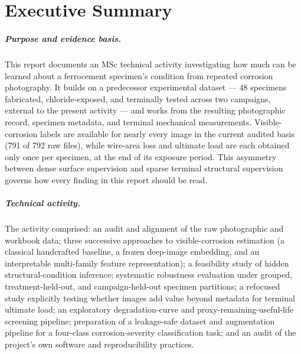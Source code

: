 \chapter*{Executive Summary}

\paragraph{Purpose and evidence basis.} This report documents an MSc
technical activity investigating how much can be learned about a
ferrocement specimen's condition from repeated corrosion photography. It
builds on a predecessor experimental dataset — 48 specimens fabricated,
chloride-exposed, and terminally tested across two campaigns, external to
the present activity — and works from the resulting photographic record,
specimen metadata, and terminal mechanical measurements. Visible-corrosion
labels are available for nearly every image in the current audited basis
(791 of 792 raw files), while wire-area loss and ultimate load are each
obtained only once per specimen, at the end of its exposure period. This
asymmetry between dense surface supervision and sparse terminal structural
supervision governs how every finding in this report should be read.

\paragraph{Technical activity.} The activity comprised: an audit and
alignment of the raw photographic and workbook data; three successive
approaches to visible-corrosion estimation (a classical handcrafted
baseline, a frozen deep-image embedding, and an interpretable
multi-family feature representation); a feasibility study of hidden
structural-condition inference; systematic robustness evaluation under
grouped, treatment-held-out, and campaign-held-out specimen partitions; a
refocused study explicitly testing whether images add value beyond
metadata for terminal ultimate load; an exploratory degradation-curve and
proxy-remaining-useful-life screening pipeline; preparation of a
leakage-safe dataset and augmentation pipeline for a four-class
corrosion-severity classification task; and an audit of the project's own
software and reproducibility practices.

